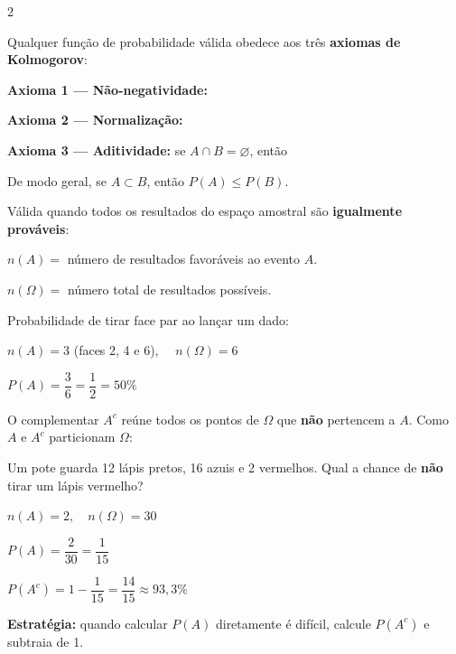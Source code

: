 \documentclass[12pt]{article}
\begin{document}
\begin{multicols}{2}

Qualquer função de probabilidade válida obedece aos três \textbf{axiomas de Kolmogorov}:

\vspace{4px}
\textbf{Axioma 1 — Não-negatividade:}

\textbf{Axioma 2 — Normalização:}

\textbf{Axioma 3 — Aditividade:} se $A \cap B = \varnothing$, então

De modo geral, se $A \subset B$, então $P(A) \leq P(B)$.


Válida quando todos os resultados do espaço amostral são \textbf{igualmente prováveis}:


$n(A) =$ número de resultados favoráveis ao evento $A$.

$n(\Omega)=$ número total de resultados possíveis.


Probabilidade de tirar face par ao lançar um dado:

$n(A) = 3$ (faces 2, 4 e 6), $\quad n(\Omega) = 6$
\vspace{5px}

$P(A) = \dfrac{3}{6} = \dfrac{1}{2} = 50\%$



O complementar $A^c$ reúne todos os pontos de $\Omega$ que \textbf{não} pertencem a $A$. Como $A$ e $A^c$ particionam $\Omega$:



Um pote guarda 12 lápis pretos, 16 azuis e 2 vermelhos. Qual a chance de \textbf{não} tirar um lápis vermelho?

$n(A)=2,\quad n(\Omega)=30$
\vspace{5px}

$P(A)=\dfrac{2}{30}=\dfrac{1}{15}$
\vspace{5px}

$P(A^c)=1-\dfrac{1}{15}=\dfrac{14}{15} \approx 93{,}3\%$

\vspace{4px}
\textbf{Estratégia:} quando calcular $P(A)$ diretamente é difícil, calcule $P(A^c)$ e subtraia de 1.


\end{multicols}
\end{document}
